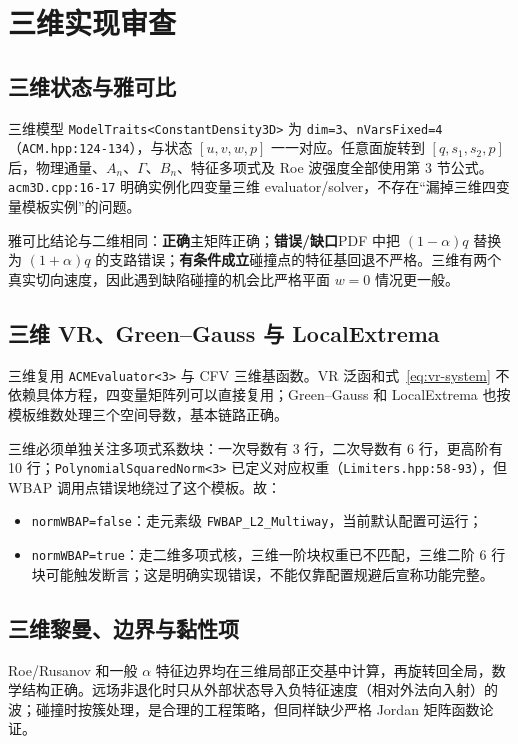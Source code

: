 \documentclass[UTF8,11pt,a4paper]{ctexart}
\newcommand{\statusok}{\textcolor{OKGreen}{\textbf{正确}}}
\newcommand{\statusconditional}{\textcolor{WarnOrange}{\textbf{有条件成立}}}
\newcommand{\statuserror}{\textcolor{ErrorRed}{\textbf{错误/缺口}}}
\newcommand{\code}[1]{\nolinkurl{#1}}
\begin{document}
\section{三维实现审查}

\subsection{三维状态与雅可比}

三维模型 \code{ModelTraits<ConstantDensity3D>} 为 \code{dim=3}、\code{nVarsFixed=4}（\code{ACM.hpp:124-134}），与状态 $[u,v,w,p]$ 一一对应。任意面旋转到 $[q,s_1,s_2,p]$ 后，物理通量、$A_n$、$\Gamma$、$B_n$、特征多项式及 Roe 波强度全部使用第 3 节公式。\code{acm3D.cpp:16-17} 明确实例化四变量三维 evaluator/solver，不存在“漏掉三维四变量模板实例”的问题。

雅可比结论与二维相同：\statusok 主矩阵正确；\statuserror PDF 中把 $(1-\alpha)q$ 替换为 $(1+\alpha)q$ 的支路错误；\statusconditional 碰撞点的特征基回退不严格。三维有两个真实切向速度，因此遇到缺陷碰撞的机会比严格平面 $w=0$ 情况更一般。

\subsection{三维 VR、Green--Gauss 与 LocalExtrema}

三维复用 \code{ACMEvaluator<3>} 与 CFV 三维基函数。VR 泛函和式~\eqref{eq:vr-system} 不依赖具体方程，四变量矩阵列可以直接复用；Green--Gauss 和 LocalExtrema 也按模板维数处理三个空间导数，基本链路正确。

三维必须单独关注多项式系数块：一次导数有 3 行，二次导数有 6 行，更高阶有 10 行；\code{PolynomialSquaredNorm<3>} 已定义对应权重（\code{Limiters.hpp:58-93}），但 WBAP 调用点错误地绕过了这个模板。故：

\begin{itemize}
  \item \code{normWBAP=false}：走元素级 \code{FWBAP_L2_Multiway}，当前默认配置可运行；
  \item \code{normWBAP=true}：走二维多项式核，三维一阶块权重已不匹配，三维二阶 6 行块可能触发断言；这是明确实现错误，不能仅靠配置规避后宣称功能完整。
\end{itemize}

\subsection{三维黎曼、边界与黏性项}

Roe/Rusanov 和一般 $\alpha$ 特征边界均在三维局部正交基中计算，再旋转回全局，数学结构正确。远场非退化时只从外部状态导入负特征速度（相对外法向入射）的波；碰撞时按簇处理，是合理的工程策略，但同样缺少严格 Jordan 矩阵函数论证。
\end{document}
